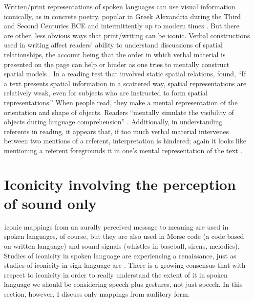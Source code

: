 \documentclass[output=paper,
modfonts
]{LSP/langsci}
\begin{document}
Written/print representations of spoken languages can use visual
information iconically, as in concrete poetry, popular in Greek
Alexandria during the Third and Second
Centuries BCE and intermittently up to modern times \citep{newell1976}. But
there are other, less obvious ways that print/writing can be iconic.
Verbal constructions used in writing affect readers' ability to
understand discussions of spatial relationships, the account being that
the order in which verbal material is presented on the page can help or
hinder as one tries to mentally construct spatial models \citep{moeser1976,morris1982,ehrlich1982,louwerse2008,zwaan2003}. In a reading test that involved static
spatial relations, \citet[119]{zwaan1993} found, ``If a text presents spatial
information in a scattered way, spatial representations are relatively
weak, even for subjects who are instructed to form spatial
representations.'' When people read, they make a mental representation
of the orientation \citep{stanfield2001} and shape \citep{zwaan2002} of objects. Readers ``mentally simulate the
visibility of objects during language comprehension'' \citep[229]{yaxley2007}. Additionally, in understanding referents in reading, it
appears that, if too much verbal material intervenes between two
mentions of a referent, interpretation is hindered; again it looks like
mentioning a referent foregrounds it in one's mental representation of
the text \citep{sanford1981}.

\section{Iconicity involving the perception of sound only}

Iconic mappings from an aurally perceived message to meaning are used in
spoken languages, of course, but they are also used in Morse code (a
code based on written language) and sound signals (whistles in baseball,
sirens, melodies). Studies of iconicity in spoken language are
experiencing a renaissance, just as studies of iconicity in sign
language are \citep{perniss2010}. There is a growing
consensus \citep{vigliocco2014,goldin2015} that with respect to iconicity in order to really
understand the extent of it in spoken language we should be considering
speech plus gestures, not just speech. In this section, however, I
discuss only mappings from auditory form.
\end{document}
